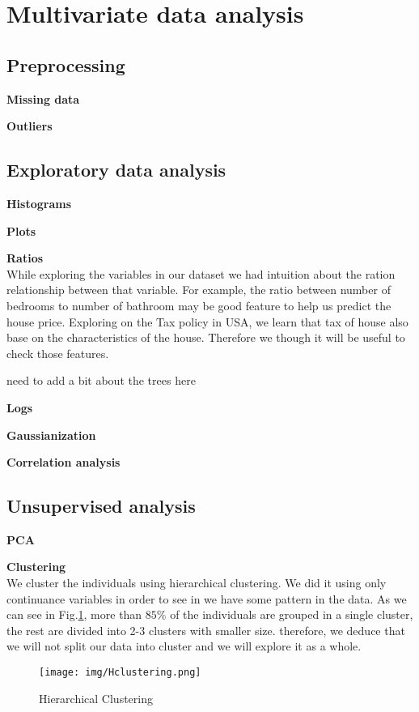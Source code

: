 \section{Multivariate data analysis}

\subsection{Preprocessing}

\textbf{Missing data}

\textbf{Outliers}


\subsection{Exploratory data analysis}

\textbf{Histograms}

\textbf{Plots}

\textbf{Ratios}\\
While exploring the variables in our dataset we had intuition about the ration relationship between that variable. For example, the ratio between number of bedrooms to number of bathroom may be good feature to help us predict the house price. Exploring on the Tax policy in USA\cite{tax}, we learn that tax of house also base on the characteristics of the house. Therefore we though it will be useful to check those features.

need to add a bit about the trees here



\textbf{Logs}

\textbf{Gaussianization}

\textbf{Correlation analysis}

\subsection{Unsupervised analysis}

\textbf{PCA}
\begin{multicols}{2}
\textbf{Clustering}\\
We cluster the individuals using hierarchical clustering. We did it using only continuance variables in order to see in we have some pattern in the data. As we can see in Fig.\ref{fig:hcluster}, more than $85\%$ of the individuals are grouped in a single cluster, the rest are divided into 2-3 clusters with smaller size. therefore, we deduce that we will not split our data into cluster and we will explore it as a whole.
\begin{figure}[H]
\centering
\texttt{[image: img/Hclustering.png]}
\caption{Hierarchical Clustering}
\label{fig:hcluster}
\end{figure}
\end{multicols}
